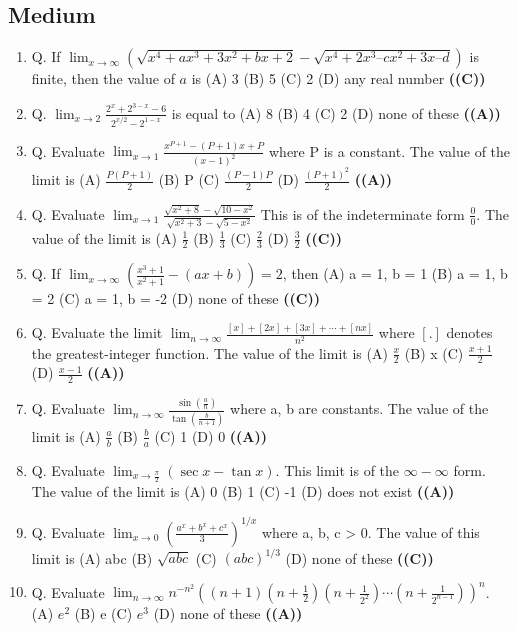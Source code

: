 \documentclass{article}
\begin{document}
\subsection{Medium}
\begin{enumerate}
\item Q. If $\lim_{x\to\infty} (\sqrt{x^4 + ax^3 + 3x^2 + bx + 2} - \sqrt{x^4 + 2x^3 – cx^2 + 3x – d})$ is finite, then the value
of $a$ is
(A) 3
(B) 5
(C) 2
(D) any real number \hfill \textbf{((C))}
\item Q. $\lim_{x \to 2} \frac{2^x + 2^{3-x} - 6}{2^{x/2} - 2^{1-x}}$ is equal to
(A) 8
(B) 4
(C) 2
(D) none of these \hfill \textbf{((A))}
\item Q. Evaluate
$\lim_{x \to 1} \frac{x^{P+1} - (P+1)x + P}{(x-1)^2}$
where P is a constant. The value of the limit is
(A) $\frac{P(P+1)}{2}$
(B) P
(C) $\frac{(P-1)P}{2}$
(D) $\frac{(P+1)^2}{2}$ \hfill \textbf{((A))}
\item Q. Evaluate
$\lim_{x \to 1} \frac{\sqrt{x^2+8} - \sqrt{10-x^2}}{\sqrt{x^2+3} - \sqrt{5-x^2}}$
This is of the indeterminate form $\frac{0}{0}$. The value of the limit is
(A) $\frac{1}{2}$
(B) $\frac{1}{3}$
(C) $\frac{2}{3}$
(D) $\frac{3}{2}$ \hfill \textbf{((C))}
\item Q. If
$\lim_{x \to \infty} (\frac{x^3+1}{x^2+1} - (ax+b)) = 2$,
then
(A) a = 1, b = 1
(B) a = 1, b = 2
(C) a = 1, b = -2
(D) none of these \hfill \textbf{((C))}
\item Q. Evaluate the limit
$\lim_{n \to \infty} \frac{[x] + [2x] + [3x] + \cdots + [nx]}{n^2}$
where $[.]$ denotes the greatest-integer function. The value of the limit is
(A) $\frac{x}{2}$
(B) x
(C) $\frac{x+1}{2}$
(D) $\frac{x-1}{2}$ \hfill \textbf{((A))}
\item Q. Evaluate
$\lim_{n \to \infty} \frac{\sin(\frac{a}{n})}{\tan(\frac{b}{n+1})}$
where a, b are constants. The value of the limit is
(A) $\frac{a}{b}$
(B) $\frac{b}{a}$
(C) 1
(D) 0 \hfill \textbf{((A))}
\item Q. Evaluate
$\lim_{x \to \frac{\pi}{2}} (\sec x - \tan x)$.
This limit is of the $\infty - \infty$ form. The value of the limit is
(A) 0
(B) 1
(C) -1
(D) does not exist \hfill \textbf{((A))}
\item Q. Evaluate
$\lim_{x \to 0} (\frac{a^x + b^x + c^x}{3})^{1/x}$
where a, b, c > 0. The value of this limit is
(A) abc
(B) $\sqrt{abc}$
(C) $(abc)^{1/3}$
(D) none of these \hfill \textbf{((C))}
\item Q. Evaluate
$\lim_{n \to \infty} n^{-n^2} ((n+1)(n+\frac{1}{2})(n+\frac{1}{2^2}) \cdots (n+\frac{1}{2^{n-1}}))^n$.
(A) $e^2$
(B) e
(C) $e^3$
(D) none of these \hfill \textbf{((A))}
\end{enumerate}
\end{document}
